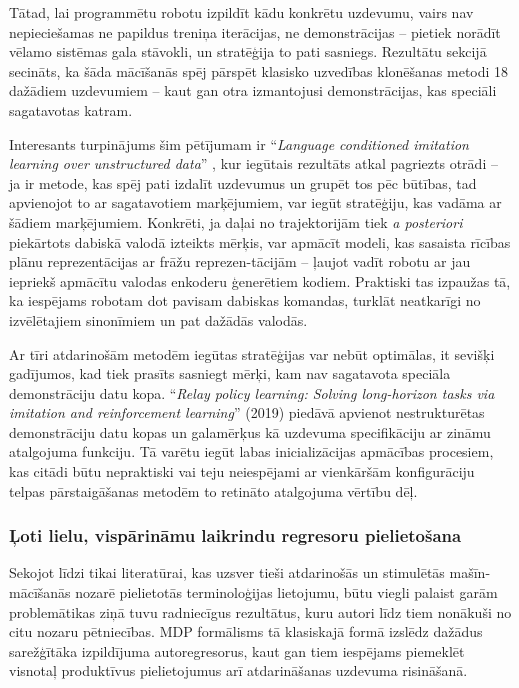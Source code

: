 \documentclass[12pt, a4paper]{article}
\numberwithin{equation}{section} %
\begin{document}
Tātad, lai programmētu robotu izpildīt kādu konkrētu uzdevumu, vairs nav nepieciešamas ne papildus treniņa iterācijas, ne demonstrācijas -- pietiek norādīt vēlamo sistēmas gala stāvokli, un stratēģija to pati sasniegs. Rezultātu sekcijā secināts, ka šāda mācīšanās spēj pārspēt klasisko uzvedības klonēšanas metodi 18 dažādiem uzdevumiem -- kaut gan otra izmantojusi demonstrācijas, kas speciāli sagatavotas katram. 

Interesants turpinājums šim pētījumam ir ``\textit{Language conditioned imitation learning over unstructured data}'' \cite{lynch2021language}, kur iegūtais rezultāts atkal pagriezts otrādi -- ja ir metode, kas spēj pati izdalīt uzdevumus un grupēt tos pēc būtības, tad apvienojot to ar sagatavotiem marķējumiem, var iegūt stratēģiju, kas vadāma ar šādiem marķējumiem. Konkrēti, ja daļai no trajektorijām tiek \textit{a posteriori} piekārtots dabiskā valodā izteikts mērķis, var apmācīt modeli, kas sasaista rīcības plānu reprezentācijas ar frāžu reprezen-tācijām -- ļaujot vadīt robotu ar jau iepriekš apmācītu valodas enkoderu ģenerētiem kodiem. Praktiski tas izpaužas tā, ka iespējams robotam dot pavisam dabiskas komandas, turklāt neatkarīgi no izvēlētajiem sinonīmiem un pat dažādās valodās.

Ar tīri atdarinošām metodēm iegūtas stratēģijas var nebūt optimālas, it sevišķi gadījumos, kad tiek prasīts sasniegt mērķi, kam nav sagatavota speciāla demonstrāciju datu kopa. ``\textit{Relay policy learning: Solving long-horizon tasks via imitation and reinforcement learning}'' \cite{gupta2019relay} (2019) piedāvā apvienot nestrukturētas demonstrāciju datu kopas un galamērķus kā uzdevuma specifikāciju ar zināmu atalgojuma funkciju. Tā varētu iegūt labas inicializācijas apmācības procesiem, kas citādi būtu nepraktiski vai teju neiespējami ar vienkāršām konfigurāciju telpas pārstaigāšanas metodēm to retināto atalgojuma vērtību dēļ.

\subsubsection{Ļoti lielu, vispārināmu laikrindu regresoru pielietošana}

Sekojot līdzi tikai literatūrai, kas uzsver tieši atdarinošās un stimulētās mašīn-mācīšanās nozarē pielietotās terminoloģijas lietojumu, būtu viegli palaist garām problemātikas ziņā tuvu radniecīgus rezultātus, kuru autori līdz tiem nonākuši no citu nozaru pētniecības. MDP formālisms tā klasiskajā formā izslēdz dažādus sarežģītāka izpildījuma autoregresorus, kaut gan tiem iespējams piemeklēt visnotaļ produktīvus pielietojumus arī atdarināšanas uzdevuma risināšanā.
\end{document}
